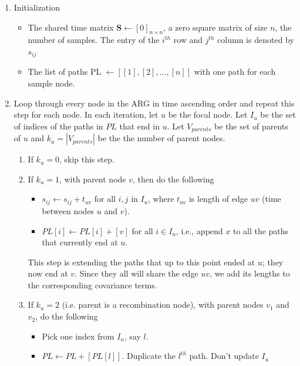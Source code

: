 \begin{enumerate}
    \item Initialization 
    \begin{itemize}
        \item The shared time matrix $\mathbf{S} \leftarrow [0]_{n \times n}$, a zero square matrix of size $n$, the number of samples. The entry of the $i^{th}$ row and $j^{th}$ column is denoted by $s_{ij}$
        \item The list of paths PL $\leftarrow [ [1], [2],..., [n]  ] $ with one path for each sample node. 
    \end{itemize}
    \item Loop through every node in the ARG in time ascending order and repeat this step for each node. In each iteration, let $u$ be the focal node. Let $I_u$ be the set of indices of the paths in $PL$ that end in $u$. Let $V_{parents}$ be the set of parents of $u$ and $k_u = |V_{parents}|$ be the the number of parent nodes.
    \begin{enumerate}
        \item If $k_u=0$, skip this step. 
        \item If $k_u=1$, with parent node $v$, then do the following 
        \begin{itemize}
            \item $s_{ij} \leftarrow s_{ij} + t_{uv}$ for all $i,j$ in $I_u$, where $t_{uv}$ is length of edge $uv$ (time between nodes $u$ and $v$).
            \item $PL[i] \leftarrow PL[i] + [v]$ for all $i \in I_u$, i.e., append $x$ to all the paths that currently end at $u$.
        \end{itemize} 
        This step is extending the paths that up to this point ended at $u$; they now end at $v$. Since they all will share the edge $uv$, we add its lengths to the corresponding covariance terms.
        \item If $k_u=2$ (i.e. parent is a recombination node), with parent nodes $v_1$ and $v_2$, do the following 
            \begin{itemize}
                \item Pick one index from $I_u$, say $l$.
                \item $PL \leftarrow PL + [ PL[l] ] $. Duplicate the $l^{th}$ path. Don't update $I_u$

\end{itemize}
\end{enumerate}
\end{enumerate}
